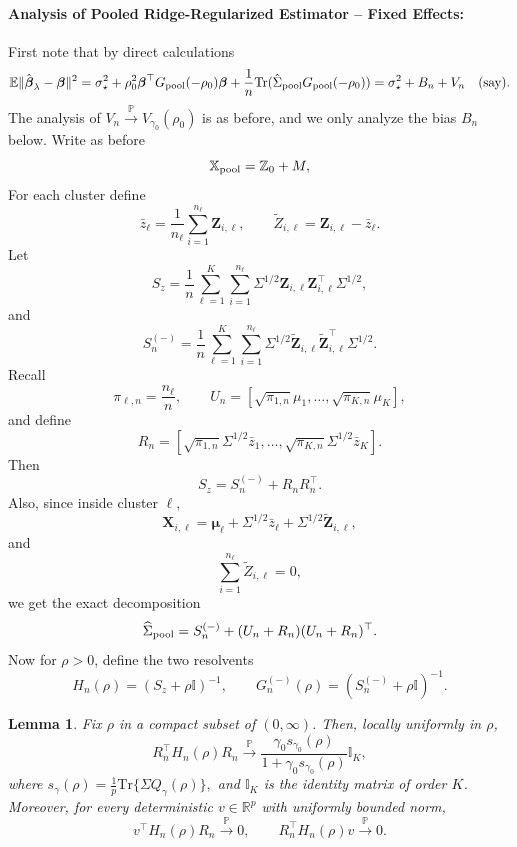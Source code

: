 \documentclass{article}
\theoremstyle{plain}
\newtheorem{lemma}[theorem]{Lemma}
\theoremstyle{remark}
\def \bbeta{\boldsymbol{\beta}}
\def \bZ{\mathbf{Z}}
\def \bbeta{\boldsymbol{\beta}}
\def \Xm {\mathbb{X}_{\rm pool}}
\def \tr {\mathrm{Tr}}
\def \bX{\mathbf{X}}
\def \I{\mathcal{I}}
\def \E{\mathbb{E}}
\def \P{\mathbb{P}}
\def \bmu{\pmb{\mu}}
\def \bZ {{\boldsymbol{Z}}}
\def \bX{\boldsymbol{X}}
\def \I {\mathbb{I}}
\begin{document}
\paragraph{Analysis of Pooled Ridge-Regularized Estimator -- Fixed Effects:} First note that by direct calculations
\begin{align*}
    \E\|\hat{\bbeta}_{\lambda}-\bbeta\|^2=\sigma_\star^2+\rho_0^2\bbeta^\top G_{\rm pool}(-\rho_0)\bbeta+\frac{1}{n}\tr(\hat{\Sigma}_{\rm pool}G_{\rm pool}(-\rho_0))=\sigma_\star^2+B_n+V_n \quad (\text{say}).
\end{align*}
The analysis of $V_n\stackrel{\P}{\to}V_{\gamma_0}(\rho_0)$ is as before, and we only analyze the bias $B_n$ below.
Write as before
\[
\Xm=\mathbb{Z}_0+M,
\]
For each cluster define
\[
\bar z_\ell
=
\frac1{n_\ell}\sum_{i=1}^{n_\ell}\bZ_{i,\ell},
\qquad
\widetilde Z_{i,\ell}
=
\bZ_{i,\ell}-\bar z_\ell.
\]
Let
\[
S_z
=
\frac1n
\sum_{\ell=1}^K
\sum_{i=1}^{n_\ell}
\Sigma^{1/2}\bZ_{i,\ell}\bZ_{i,\ell}^\top\Sigma^{1/2},
\]
and
\[
S_n^{(-)}
=
\frac1n
\sum_{\ell=1}^K
\sum_{i=1}^{n_\ell}
\Sigma^{1/2}
\widetilde \bZ_{i,\ell}
\widetilde \bZ_{i,\ell}^{\top}
\Sigma^{1/2}.
\]
Recall
\[
\pi_{\ell,n}=\frac{n_\ell}{n},
\qquad
U_n=
[
\sqrt{\pi_{1,n}}\mu_1,\ldots,\sqrt{\pi_{K,n}}\mu_K
],
\]
and define
\[
R_n=
[
\sqrt{\pi_{1,n}}\Sigma^{1/2}\bar z_1,\ldots,
\sqrt{\pi_{K,n}}\Sigma^{1/2}\bar z_K
].
\]
Then
\[
S_z
=
S_n^{(-)}+R_nR_n^\top.
\]
Also, since inside cluster \(\ell\),
\[
\bX_{i,\ell}
=
\bmu_\ell+\Sigma^{1/2}\bar z_\ell
+
\Sigma^{1/2}\widetilde \bZ_{i,\ell},
\]
and
\[
\sum_{i=1}^{n_\ell}\widetilde Z_{i,\ell}=0,
\]
we get the exact decomposition
\[
\widehat\Sigma_{\rm pool}
=
S_n^{(-)}+(U_n+R_n)(U_n+R_n)^\top.
\]
Now for \(\rho>0\), define the two resolvents
\[
H_n(\rho)
=
(S_z+\rho \I)^{-1},
\qquad
G_n^{(-)}(\rho)
=
(S_n^{(-)}+\rho \I)^{-1}.
\]
\begin{lemma}\label{lemma:hn}
    Fix \(\rho\) in a compact subset of \((0,\infty)\). Then, locally uniformly in \(\rho\),
\[
R_n^\top H_n(\rho)R_n
\overset{\P}{\longrightarrow}
\frac{\gamma_0s_{\gamma_0}(\rho)}
{1+\gamma_0s_{\gamma_0}(\rho)}
\I_K,
\]
where $s_\gamma(\rho)
    =
    \frac1p\tr\{\Sigma Q_\gamma(\rho)\},$ and $\I_K$ is the identity matrix of order $K$.
Moreover, for every deterministic \(v\in\mathbb R^p\) with uniformly bounded norm,
\[
v^\top H_n(\rho)R_n
\overset{\P}{\longrightarrow}0,
\qquad
R_n^\top H_n(\rho)v
\overset{\P}{\longrightarrow}0.
\]

\end{lemma}
\end{document}

